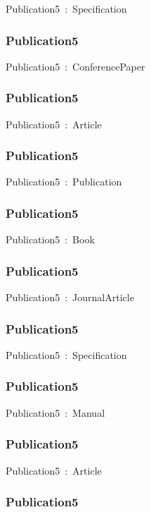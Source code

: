 \documentclass{article}
\begin{document}
Publication5~:~Specification

\subsubsection*{Publication5}

Publication5~:~ConferencePaper

\subsubsection*{Publication5}

Publication5~:~Article

\subsubsection*{Publication5}

Publication5~:~Publication

\subsubsection*{Publication5}

Publication5~:~Book

\subsubsection*{Publication5}

Publication5~:~JournalArticle

\subsubsection*{Publication5}

Publication5~:~Specification

\subsubsection*{Publication5}

Publication5~:~Manual

\subsubsection*{Publication5}

Publication5~:~Article

\subsubsection*{Publication5}
\end{document}
